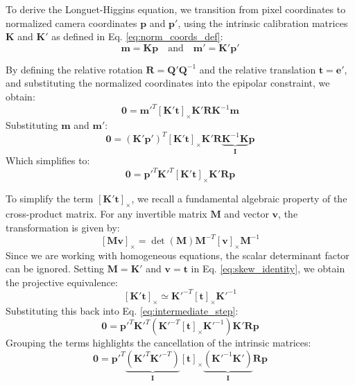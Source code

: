 \documentclass[11pt,a4paper]{article}
\theoremstyle{definition}
\theoremstyle{plain}
\theoremstyle{remark}
\begin{document}
To derive the Longuet-Higgins equation, we transition from pixel coordinates to normalized camera coordinates $\mathbf{p}$ and $\mathbf{p'}$, using the intrinsic calibration matrices $\mathbf{K}$ and $\mathbf{K'}$ as defined in Eq. \eqref{eq:norm_coords_def}:
\begin{equation} \nonumber
    \mathbf{m} = \mathbf{K}\mathbf{p} \quad \text{and} \quad \mathbf{m'} = \mathbf{K'}\mathbf{p'}
\end{equation}

By defining the relative rotation $\mathbf{R} = \mathbf{Q'}\mathbf{Q}^{-1}$ and the relative translation $\mathbf{t} = \mathbf{e'}$, and substituting the normalized coordinates into the epipolar constraint, we obtain:
\begin{equation} \nonumber
    \mathbf{0} = \mathbf{m}'^{T} [\mathbf{K'}\mathbf{t}]_{\times} \mathbf{K'}\mathbf{R} \mathbf{K}^{-1} \mathbf{m}
\end{equation}
Substituting $\mathbf{m}$ and $\mathbf{m'}$:
\begin{equation} \nonumber
    \mathbf{0} = (\mathbf{K'}\mathbf{p'})^{T} [\mathbf{K'}\mathbf{t}]_{\times} \mathbf{K'}\mathbf{R} \underbrace{\mathbf{K}^{-1} \mathbf{K}}_{\mathbf{I}} \mathbf{p}
\end{equation}
Which simplifies to:
\begin{equation} \label{eq:intermediate_step}
    \mathbf{0} = \mathbf{p'}^{T} \mathbf{K'}^{T} [\mathbf{K'}\mathbf{t}]_{\times} \mathbf{K'}\mathbf{R} \mathbf{p}
\end{equation}

To simplify the term $[\mathbf{K'}\mathbf{t}]_{\times}$, we recall a fundamental algebraic property of the cross-product matrix. For any invertible matrix $\mathbf{M}$ and vector $\mathbf{v}$, the transformation is given by:
\begin{equation} \label{eq:skew_identity}
    [\mathbf{M}\mathbf{v}]_{\times} = \det(\mathbf{M}) \mathbf{M}^{-T} [\mathbf{v}]_{\times} \mathbf{M}^{-1}
\end{equation}
Since we are working with homogeneous equations, the scalar determinant factor can be ignored. Setting $\mathbf{M} = \mathbf{K'}$ and $\mathbf{v} = \mathbf{t}$ in Eq. \eqref{eq:skew_identity}, we obtain the projective equivalence:
\begin{equation} \nonumber
    [\mathbf{K'}\mathbf{t}]_{\times} \simeq \mathbf{K'}^{-T} [\mathbf{t}]_{\times} \mathbf{K'}^{-1}
\end{equation}
Substituting this back into Eq. \eqref{eq:intermediate_step}:
\begin{equation} \nonumber
    \mathbf{0} = \mathbf{p'}^{T} \mathbf{K'}^{T} \left( \mathbf{K'}^{-T} [\mathbf{t}]_{\times} \mathbf{K'}^{-1} \right) \mathbf{K'}\mathbf{R} \mathbf{p}
\end{equation}
Grouping the terms highlights the cancellation of the intrinsic matrices:
\begin{equation} \nonumber
    \mathbf{0} = \mathbf{p'}^{T} \underbrace{\left(\mathbf{K'}^{T} \mathbf{K'}^{-T}\right)}_{\mathbf{I}} [\mathbf{t}]_{\times} \underbrace{\left(\mathbf{K'}^{-1} \mathbf{K'}\right)}_{\mathbf{I}} \mathbf{R} \mathbf{p}
\end{equation}
\end{document}
